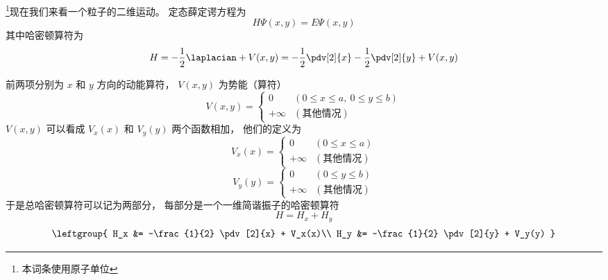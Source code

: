 

\footnote{本词条使用原子单位}现在我们来看一个粒子的二维运动。 定态薛定谔方程为
\begin{equation}\label{ISW2D_eq1}
H \Psi(x, y) = E \Psi(x, y)
\end{equation}
其中哈密顿算符为
\begin{equation}
H = -\frac{1}{2} \laplacian + V(x, y) =  -\frac{1}{2} \pdv[2]{x} -\frac{1}{2} \pdv[2]{y}  + V(x, y)
\end{equation}

前两项分别为 $x$ 和 $y$ 方向的动能算符， $V(x, y)$ 为势能（算符）
\begin{equation}
V(x, y) =
\begin{cases}
0  & (0 \leqslant x \leqslant a,\: 0 \leqslant y \leqslant b)\\
+\infty & (\text{其他情况})
\end{cases}
\end{equation}
$V(x, y)$ 可以看成 $V_x(x)$ 和 $V_y(y)$ 两个函数相加， 他们的定义为
\begin{equation}
V_x(x) =
\begin{cases}
0  & (0 \leqslant x \leqslant a)\\
+\infty & (\text{其他情况})
\end{cases}
\end{equation}
\begin{equation}
V_y(y) =
\begin{cases}
0  & (0 \leqslant y \leqslant b)\\
+\infty & (\text{其他情况})
\end{cases}
\end{equation}
于是总哈密顿算符可以记为两部分， 每部分是一个一维简谐振子的哈密顿算符
\begin{equation}
H = H_x + H_y
\end{equation}
\begin{equation}
\leftgroup{
H_x &= -\frac{1}{2} \pdv[2]{x} + V_x(x)\\
H_y &= -\frac{1}{2} \pdv[2]{y} + V_y(y)
}
\end{equation}

